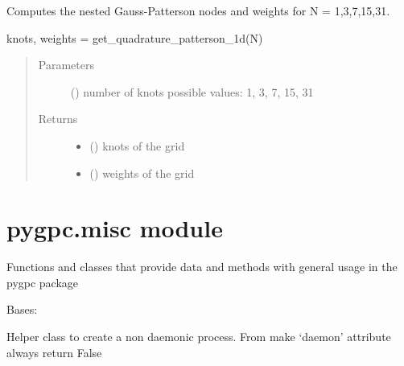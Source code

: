 \documentclass[letterpaper,10pt,english,openany,oneside]{sphinxmanual}
\begin{document}
\begin{fulllineitems}
\label{\detokenize{pygpc:pygpc.grid.get_quadrature_patterson_1d}}
Computes the nested Gauss-Patterson nodes and weights for N = 1,3,7,15,31.

knots, weights = get\_quadrature\_patterson\_1d(N)
\begin{quote}\begin{description}
\item[{Parameters}] \leavevmode
{} () \textendash{} number of knots
possible values: 1, 3, 7, 15, 31

\item[{Returns}] \leavevmode
\begin{itemize}
\item {} 
 () \textendash{} knots of the grid

\item {} 
 () \textendash{} weights of the grid

\end{itemize}


\end{description}\end{quote}

\end{fulllineitems}



\section{pygpc.misc module}
\label{\detokenize{pygpc:module-pygpc.misc}}\label{\detokenize{pygpc:pygpc-misc-module}}
Functions and classes that provide data and methods with general usage in the pygpc package

\begin{fulllineitems}
\label{\detokenize{pygpc:pygpc.misc.NoDaemonProcess}}
Bases: 

Helper class to create a non daemonic process.
From 
make ‘daemon’ attribute always return False

\begin{fulllineitems}
\label{\detokenize{pygpc:pygpc.misc.NoDaemonProcess.daemon}}
\end{fulllineitems}


\end{fulllineitems}
\end{document}

